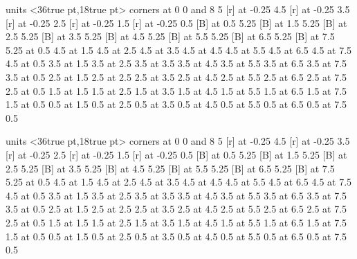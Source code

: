 \endpicture
\bigskip

\beginpicture
\setcoordinatesystem units <36true pt,18true pt>
\putrectangle corners at 0 0 and 8 5
 [r] at -0.25 4.5
 [r] at -0.25 3.5
 [r] at -0.25 2.5
 [r] at -0.25 1.5
 [r] at -0.25 0.5
 [B] at 0.5 5.25
 [B] at 1.5 5.25
 [B] at 2.5 5.25
 [B] at 3.5 5.25
 [B] at 4.5 5.25
 [B] at 5.5 5.25
 [B] at 6.5 5.25
 [B] at 7.5 5.25
 at 0.5 4.5
 at 1.5 4.5
 at 2.5 4.5
 at 3.5 4.5
 at 4.5 4.5
 at 5.5 4.5
 at 6.5 4.5
 at 7.5 4.5
 at 0.5 3.5
 at 1.5 3.5
 at 2.5 3.5
 at 3.5 3.5
 at 4.5 3.5
 at 5.5 3.5
 at 6.5 3.5
 at 7.5 3.5
 at 0.5 2.5
 at 1.5 2.5
 at 2.5 2.5
 at 3.5 2.5
 at 4.5 2.5
 at 5.5 2.5
 at 6.5 2.5
 at 7.5 2.5
 at 0.5 1.5
 at 1.5 1.5
 at 2.5 1.5
 at 3.5 1.5
 at 4.5 1.5
 at 5.5 1.5
 at 6.5 1.5
 at 7.5 1.5
 at 0.5 0.5
 at 1.5 0.5
 at 2.5 0.5
 at 3.5 0.5
 at 4.5 0.5
 at 5.5 0.5
 at 6.5 0.5
 at 7.5 0.5
\endpicture
\bigskip

\beginpicture
\setcoordinatesystem units <36true pt,18true pt>
\putrectangle corners at 0 0 and 8 5
 [r] at -0.25 4.5
 [r] at -0.25 3.5
 [r] at -0.25 2.5
 [r] at -0.25 1.5
 [r] at -0.25 0.5
 [B] at 0.5 5.25
 [B] at 1.5 5.25
 [B] at 2.5 5.25
 [B] at 3.5 5.25
 [B] at 4.5 5.25
 [B] at 5.5 5.25
 [B] at 6.5 5.25
 [B] at 7.5 5.25
 at 0.5 4.5
 at 1.5 4.5
 at 2.5 4.5
 at 3.5 4.5
 at 4.5 4.5
 at 5.5 4.5
 at 6.5 4.5
 at 7.5 4.5
 at 0.5 3.5
 at 1.5 3.5
 at 2.5 3.5
 at 3.5 3.5
 at 4.5 3.5
 at 5.5 3.5
 at 6.5 3.5
 at 7.5 3.5
 at 0.5 2.5
 at 1.5 2.5
 at 2.5 2.5
 at 3.5 2.5
 at 4.5 2.5
 at 5.5 2.5
 at 6.5 2.5
 at 7.5 2.5
 at 0.5 1.5
 at 1.5 1.5
 at 2.5 1.5
 at 3.5 1.5
 at 4.5 1.5
 at 5.5 1.5
 at 6.5 1.5
 at 7.5 1.5
 at 0.5 0.5
 at 1.5 0.5
 at 2.5 0.5
 at 3.5 0.5
 at 4.5 0.5
 at 5.5 0.5
 at 6.5 0.5
 at 7.5 0.5
\endpicture
\bigskip
